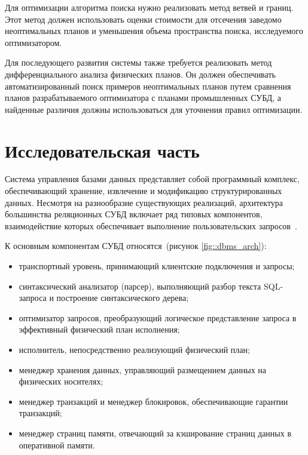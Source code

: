 \documentclass[14pt, russian]{scrartcl}
\newcommand{\refImage}[1]{(рисунок \ref{#1})}
\begin{document}
Для оптимизации алгоритма поиска нужно реализовать метод ветвей и границ. Этот
метод должен использовать оценки стоимости для отсечения заведомо неоптимальных
планов и уменьшения объема пространства поиска, исследуемого оптимизатором.

Для последующего развития системы также требуется реализовать метод
дифференциального анализа физических планов. Он должен обеспечивать
автоматизированный поиск примеров неоптимальных планов путем сравнения планов
разрабатываемого оптимизатора с планами промышленных СУБД, а найденные различия
должны использоваться для уточнения правил оптимизации.

\section{Исследовательская часть}

Система управления базами данных представляет собой программный комплекс,
обеспечивающий хранение, извлечение и модификацию структурированных данных.
Несмотря на разнообразие существующих реализаций, архитектура большинства
реляционных СУБД включает ряд типовых компонентов, взаимодействие которых
обеспечивает выполнение пользовательских запросов~\cite{petrov2019database}.

К основным компонентам СУБД относятся~\refImage{fig::dbms_arch}:

\begin{itemize}
    \item транспортный уровень, принимающий клиентские подключения и запросы;
    \item синтаксический анализатор (парсер), выполняющий разбор текста
SQL-запроса и построение синтаксического дерева;
    \item оптимизатор запросов, преобразующий логическое представление запроса в
эффективный физический план исполнения;
    \item исполнитель, непосредственно реализующий физический план;
    \item менеджер хранения данных, управляющий размещением данных на физических
носителях;
    \item менеджер транзакций и менеджер блокировок, обеспечивающие гарантии
транзакций;
    \item менеджер страниц памяти, отвечающий за кэширование страниц данных в
оперативной памяти.
\end{itemize}
\end{document}
